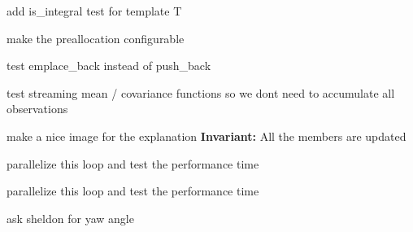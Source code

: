 
\begin{DoxyRefList}
\item[\label{todo__todo000001}%
\Hypertarget{todo__todo000001}%
Class \hyperlink{classclara_1_1cone__state}{clara\+:\+:cone\+\_\+state$<$ T $>$} ]add {\ttfamily is\+\_\+integral} test for template {\ttfamily T}  
\item[\label{todo__todo000006}%
\Hypertarget{todo__todo000006}%
Member \hyperlink{classclara_1_1cone__state_ae5c8c1ba05533a80ab1874fb878888b9}{clara\+:\+:cone\+\_\+state$<$ T $>$\+:\+:\+\_\+observations} ]make the preallocation configurable  
\item[\label{todo__todo000002}%
\Hypertarget{todo__todo000002}%
Member \hyperlink{classclara_1_1cone__state_a7cd7364ca787c25b0ca333d0cb1c3081}{clara\+:\+:cone\+\_\+state$<$ T $>$\+:\+:add\+\_\+observation} (T x, T y)]test emplace\+\_\+back instead of push\+\_\+back 

test streaming mean / covariance functions so we don\textquotesingle{}t need to accumulate all observations  
\item[\label{todo__todo000003}%
\Hypertarget{todo__todo000003}%
Member \hyperlink{classclara_1_1cone__state_a331360538f2fc8ccaaa37db2a71cc1a8}{clara\+:\+:cone\+\_\+state$<$ T $>$\+:\+:maximum\+\_\+likelihood\+\_\+estimate} (T x, T y)]make a nice image for the explanation {\bfseries Invariant\+:} All the members are updated  
\item[\label{todo__todo000005}%
\Hypertarget{todo__todo000005}%
Member \hyperlink{classclara_1_1cone__state_a946bca664d068d7a82e3740eb736e948}{clara\+:\+:cone\+\_\+state$<$ T $>$\+:\+:update\+\_\+cov\+\_\+mat} ()]parallelize this loop and test the performance time  
\item[\label{todo__todo000004}%
\Hypertarget{todo__todo000004}%
Member \hyperlink{classclara_1_1cone__state_ada683dbedcee79d84db8255ee5e71e6e}{clara\+:\+:cone\+\_\+state$<$ T $>$\+:\+:update\+\_\+mean\+\_\+vec} ()]parallelize this loop and test the performance time  
\item[\label{todo__todo000007}%
\Hypertarget{todo__todo000007}%
Class \hyperlink{classclara_1_1data__association}{clara\+:\+:data\+\_\+association$<$ N $>$} ]ask sheldon for yaw angle
\end{DoxyRefList}